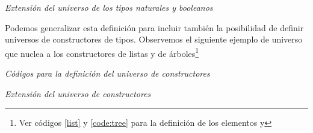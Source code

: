 \begin{agdacode}\label{code:codesextension}{\it Extensión del universo de los tipos naturales y booleanos }

\end{agdacode}

Podemos generalizar esta definición para incluir también la posibilidad de definir universos de constructores de tipos. Observemos el siguiente ejemplo de universo que nuclea a los constructores de listas y de árboles\footnote{Ver códigos \ref{list} y \ref{code:tree} para la definición de los elementos  y }

\begin{agdacode}\label{code:codes2}{\it Códigos para la definición del universo de constructores }

\end{agdacode}

\begin{agdacode}\label{code:codesextension2}{\it Extensión del universo de constructores }

\end{agdacode}





